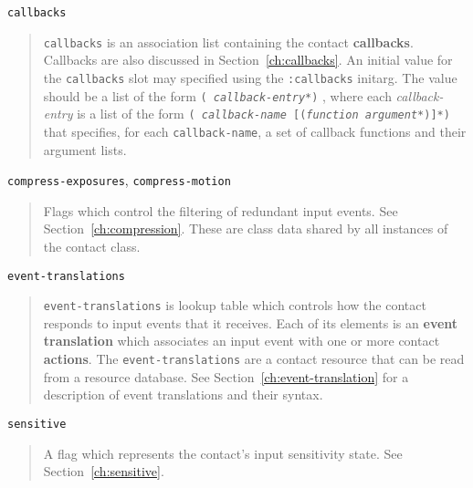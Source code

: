 \begin{flushright} \parbox[t]{6.125in}{
{\tt callbacks}
\begin{quote}
{\tt callbacks} is an association list containing the contact
{\bf callbacks}.
Callbacks are also discussed in
Section~\ref{ch:callbacks}. 	An initial value for the {\tt callbacks} slot may
	specified using the {\tt :callbacks}
	initarg.  The value should be a list of the form {\tt ({\em
	callback-entry}*)} ,
	where each {\em callback-entry} is a list of the form {\tt ({\em
	callback-name} [({\em function}
	{\em argument}*)]*)} that specifies, for each {\tt callback-name}, a set
	of callback functions and their argument lists.
\end{quote}

}\end{flushright}


\begin{flushright} \parbox[t]{6.125in}{
{\tt compress-exposures}, {\tt compress-motion}
\begin{quote}
Flags which control the filtering of redundant input events. See
Section~\ref{ch:compression}. 
These are class data shared by all instances of the contact class.
 \end{quote}

}\end{flushright}



\begin{flushright} \parbox[t]{6.125in}{
{\tt event-translations}
\begin{quote}
{\tt event-translations} is lookup table which controls how the contact
responds to input events that it receives. Each of its elements
is an {\bf event translation} which associates
an input event with one or more contact {\bf actions}. The
{\tt event-translations} are a contact resource that can be read from a
resource database. 
See Section~\ref{ch:event-translation} for
a description of event translations and their syntax. 
\end{quote}

}\end{flushright}


\begin{flushright} \parbox[t]{6.125in}{
{\tt sensitive}
\begin{quote}
A flag which represents the contact's input sensitivity state. See
Section~\ref{ch:sensitive}. \end{quote}

}\end{flushright}



